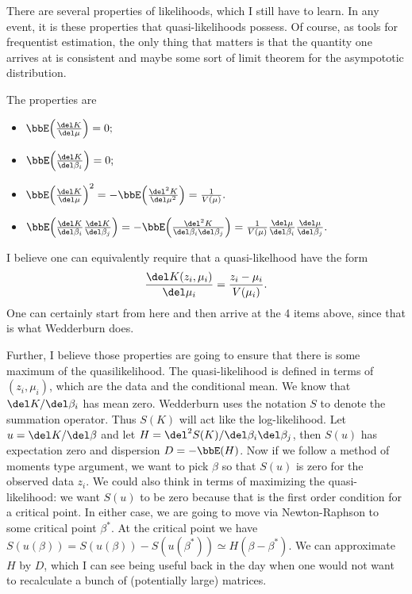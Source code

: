 \documentclass{article}
\newcommand{\graddel}[2]{\frac{\del #1}{\del #2}}
\newcommand{\hessdel}[3]{\frac{\del^2 #1}{\del #2 \del #3}}
\begin{document}
There are several properties of likelihoods, which I still have to learn.  In
any event, it is these properties that quasi-likelihoods possess.  Of course, as
tools for frequentist estimation, the only thing that matters is that the
quantity one arrives at is consistent and maybe some sort of limit theorem for
the asympototic distribution.

The properties are
\begin{itemize}
\item 
  \(
  \bbE \Big( \graddel{K}{\mu} \Big) = 0;
  \)
  
\item
  \(
  \bbE \Big( \graddel{K}{\beta_i} \Big) = 0;
  \)

\item 
  \(
  \bbE \Big( \graddel{K}{\mu} \Big)^2 = - \bbE \Big( \frac{\del^2 K}{\del \mu^2}
  \Big) = \frac{1}{V(\mu)}.
  \)

\item 
  \(
  \bbE \Big( \graddel{K}{\beta_i} \graddel{K}{\beta_j} \Big)
  = - \bbE \Big( \hessdel{K}{\beta_i}{\beta_j} \Big) 
  = \frac{1}{V(\mu)} \graddel{\mu}{\beta_i} \graddel{\mu}{\beta_j}.
  \)
\end{itemize}
I believe one can equivalently require that a quasi-likelhood have the form
\[
\frac{\del K(z_i, \mu_i)}{\del \mu_i} = \frac{z_i - \mu_i}{V(\mu_i)}.
\]
One can certainly start from here and then arrive at the 4 items above, since
that is what Wedderburn does.

Further, I believe those properties are going to ensure that there is some
maximum of the quasilikelihood.  The quasi-likelihood is defined in terms of
$(z_i, \mu_i)$, which are the data and the conditional mean.  We know that $\del
K / \del \beta_i$ has mean zero.  Wedderburn uses the notation $S$ to denote the
summation operator.  Thus $S(K)$ will act like the log-likelihood.  Let $u =
\del K / \del \beta$ and let $H = \del^2 S(K) / \del \beta_i \del \beta_j$, then
$S(u)$ has expectation zero and dispersion $D = - \bbE(H)$.  Now if we follow a
method of moments type argument, we want to pick $\beta$ so that $S(u)$ is zero
for the observed data $z_i$.  We could also think in terms of maximizing the
quasi-likelihood: we want $S(u)$ to be zero because that is the first order
condition for a critical point.  In either case, we are going to move via
Newton-Raphson to some critical point $\beta^*$.  At the critical point we have
$S(u(\beta)) = S(u(\beta)) - S(u(\beta^*)) \simeq H(\beta - \beta^*)$.  We can
approximate $H$ by $D$, which I can see being useful back in the day when one
would not want to recalculate a bunch of (potentially large) matrices.
\end{document}
